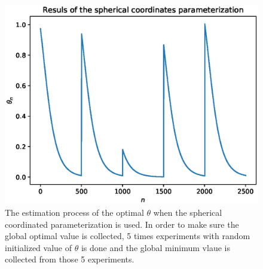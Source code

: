 \documentclass[a4paper,12pt]{article}
\begin{document}
\begin{figure}[H]
\begin{center}
\includegraphics[width=1.0\linewidth]{line_est_sphe.eps}


\end{center}
   \caption{The estimation process of the optimal $\theta$ when the spherical coordinated parameterization is used. In order to make sure the global optimal value is collected, 5 times experiments with random initialized value of $\theta$ is done and the global minimum vlaue is collected from those 5 experiments.}
\label{fig:line_result_sphe}
\end{figure}


\end{document}
